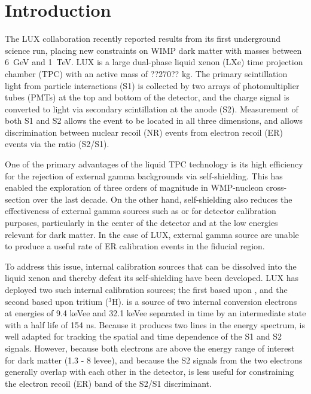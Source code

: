 \section{Introduction}

The LUX collaboration recently reported results from its first underground science run, placing new constraints on WIMP dark matter with masses between 6~GeV and 1~TeV\cite{lux_prl}. LUX is a large dual-phase liquid xenon (LXe) time projection chamber (TPC) with an active mass of ??270?? kg. The primary scintillation light from particle interactions (S1) is collected by two arrays of photomultiplier tubes (PMTs) at the top and bottom of the detector, and the charge signal is converted to light via secondary scintillation at the anode (S2). Measurement of both S1 and S2 allows the event to be located in all three dimensions, and allows discrimination between nuclear recoil (NR) events from electron recoil (ER) events via the ratio (S2/S1).

One of the primary advantages of the liquid TPC technology is its high efficiency for the rejection of external gamma backgrounds via self-shielding. This has enabled the exploration of three orders of magnitude in WMP-nucleon cross-section over the last decade. On the other hand, self-shielding also reduces the effectiveness of external gamma sources such as \cssrc or \thsrc for detector calibration purposes, particularly in the center of the detector and at the low energies relevant for dark matter. In the case of LUX, external gamma source are unable to produce a useful rate of ER calibration events in the fiducial region.  

To address this issue, internal calibration sources that can be dissolved into the liquid xenon and thereby defeat its self-shielding have been developed\cite{mckinsey,baudis}. LUX has deployed two such internal calibration sources; the first based upon \krsrc, and the second based upon tritium ($^{3}$H). \krsrc is a source of two internal conversion electrons at energies of 9.4 keVee and 32.1 keVee separated in time by an intermediate state with a half life of 154 ns. Because it produces two lines in the energy spectrum, \krsrc is well adapted for tracking the spatial and time dependence of the S1 and S2 signals. However, because both \krsrc electrons are above the energy range of interest for dark matter (1.3 - 8 levee), and because the S2 signals from the two electrons generally overlap with each other in the detector,  \krsrc is less useful for constraining the electron recoil (ER) band of the S2/S1 discriminant. 

